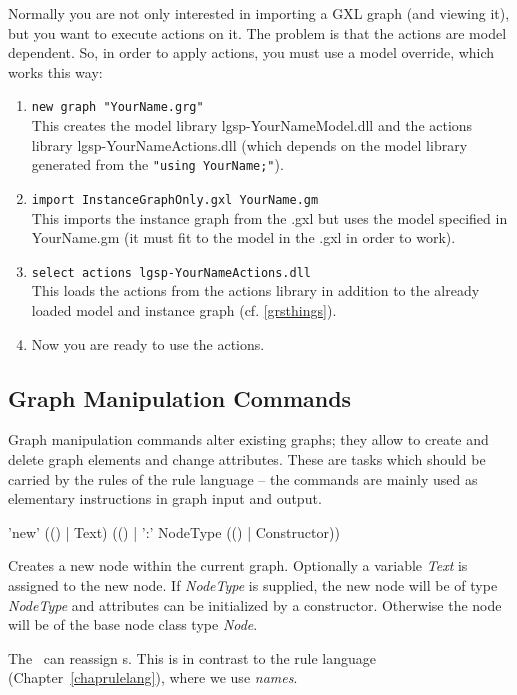 \begin{note}\label{shellgxlimport}
Normally you are not only interested in importing a GXL graph (and viewing it), but you want to execute actions on it.
The problem is that the actions are model dependent.
So, in order to apply actions, you must use a model override, which works this way:
\begin{enumerate}
\item \texttt{new graph "YourName.grg"}\\
This creates the model library lgsp-YourNameModel.dll
and the actions library lgsp-YourNameActions.dll
(which depends on the model library generated from the \texttt{"using YourName;"}).
\item \texttt{import InstanceGraphOnly.gxl YourName.gm}\\
This imports the instance graph from the .gxl but uses the model specified
in YourName.gm (it must fit to the model in the .gxl in order to work).
\item \texttt{select actions lgsp-YourNameActions.dll}\\
This loads the actions from the actions library in addition to the already
loaded model and instance graph (cf. \ref{grsthings}).
\item Now you are ready to use the actions.
\end{enumerate}
\end{note}


\subsection{Graph Manipulation Commands}
\label{mani}
Graph manipulation commands alter existing graphs; they allow to create and delete graph elements and change attributes. 
These are tasks which should be carried by the rules of the rule language -- the commands are mainly used as elementary instructions in graph input and output.

\begin{rail}
  'new' (() | Text) (() | ':' NodeType (() | Constructor))
\end{rail}
Creates a new node within the current graph.
Optionally a variable \emph{Text} is assigned to the new node.
If \emph{NodeType} is supplied, the new node will be of type \emph{NodeType} and attributes can be initialized by a constructor.
Otherwise the node will be of the base node class type \emph{Node}.
\begin{note}
The \GrShell\ can reassign s. 
This is in contrast to the rule language (Chapter~\ref{chaprulelang}), where we use \emph{names}.
\end{note}

